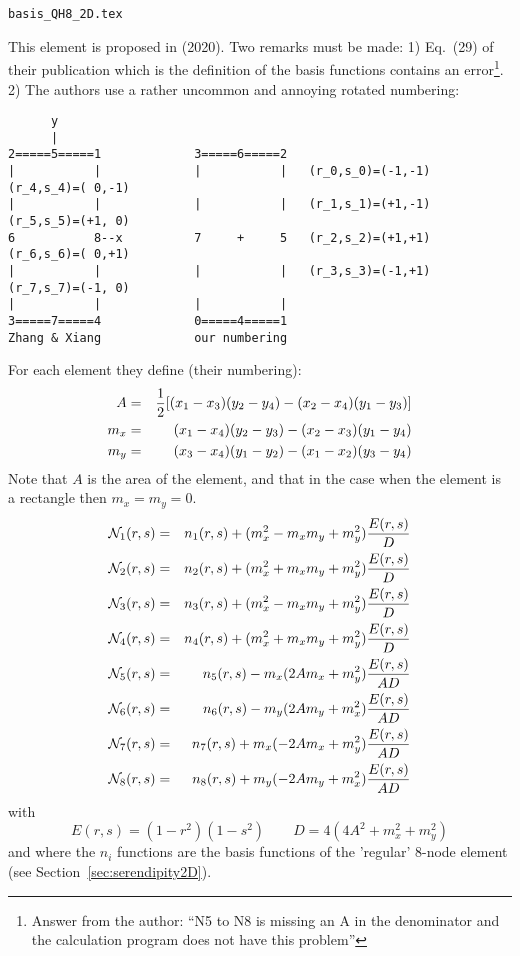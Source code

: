 \begin{flushright} {\tiny {\color{gray} \tt basis\_QH8\_2D.tex}} \end{flushright}

This element is proposed in \textcite{zhxi20} (2020). Two remarks
must be made: 1) Eq.~(29) of their publication which is the definition
of the basis functions contains an error\footnote{
Answer from the author: ``N5 to N8 is missing an A in the denominator and 
the calculation program does not have this problem''}. 
2) The authors use a rather 
uncommon and annoying rotated numbering:
\begin{verbatim}
      y
      |
2=====5=====1             3=====6=====2
|           |             |           |   (r_0,s_0)=(-1,-1)   (r_4,s_4)=( 0,-1)
|           |             |           |   (r_1,s_1)=(+1,-1)   (r_5,s_5)=(+1, 0)
6           8--x          7     +     5   (r_2,s_2)=(+1,+1)   (r_6,s_6)=( 0,+1)
|           |             |           |   (r_3,s_3)=(-1,+1)   (r_7,s_7)=(-1, 0)
|           |             |           |    
3=====7=====4             0=====4=====1
Zhang & Xiang             our numbering
\end{verbatim}

For each element they define (their numbering):
\begin{eqnarray}
A   &=& \frac{1}{2} [ (x_1-x_3)(y_2-y_4)-(x_2-x_4)(y_1-y_3) ] \nonumber\\
m_x &=& (x_1-x_4)(y_2-y_3)-(x_2-x_3)(y_1-y_4) \nonumber\\
m_y &=& (x_3-x_4)(y_1-y_2)-(x_1-x_2)(y_3-y_4) \nonumber
\end{eqnarray}
Note that $A$ is the area of the element, and that in the case when 
the element is a rectangle then $m_x=m_y=0$.
\begin{eqnarray}
{\mathcal{N}}_1(r,s)&=& n_1(r,s) +(m_x^2 - m_xm_y + m_y^2)\frac{E(r,s)}{D} \nonumber\\
{\mathcal{N}}_2(r,s)&=& n_2(r,s) +(m_x^2 + m_xm_y + m_y^2)\frac{E(r,s)}{D} \nonumber\\
{\mathcal{N}}_3(r,s)&=& n_3(r,s) +(m_x^2 - m_xm_y + m_y^2)\frac{E(r,s)}{D} \nonumber\\
{\mathcal{N}}_4(r,s)&=& n_4(r,s) +(m_x^2 + m_xm_y + m_y^2)\frac{E(r,s)}{D} \nonumber\\
{\mathcal{N}}_5(r,s)&=& n_5(r,s) -m_x(2Am_x+m_y^2)\frac{E(r,s)}{AD} \nonumber\\
{\mathcal{N}}_6(r,s)&=& n_6(r,s) -m_y(2Am_y+m_x^2)\frac{E(r,s)}{AD} \nonumber\\
{\mathcal{N}}_7(r,s)&=& n_7(r,s) +m_x(-2Am_x+m_y^2)\frac{E(r,s)}{AD} \nonumber\\
{\mathcal{N}}_8(r,s)&=& n_8(r,s) +m_y(-2Am_y+m_x^2)\frac{E(r,s)}{AD} \nonumber
\end{eqnarray}
with 
\[
E(r,s)=(1-r^2)(1-s^2)
\qquad
D=4(4A^2+m_x^2+m_y^2)
\]
and where the $n_i$ functions are the basis functions of the 'regular' 
8-node element (see Section~\ref{sec:serendipity2D}).

